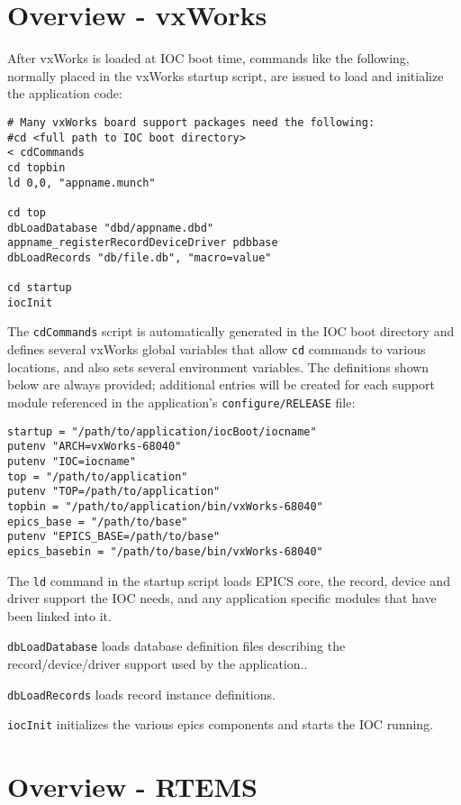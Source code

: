 \section{Overview - vxWorks}

After vxWorks is loaded at IOC boot time, commands like the following, normally placed in the vxWorks startup script, are issued to load and initialize the application code:

\begin{verbatim}
# Many vxWorks board support packages need the following:
#cd <full path to IOC boot directory>
< cdCommands
cd topbin
ld 0,0, "appname.munch"

cd top
dbLoadDatabase "dbd/appname.dbd"
appname_registerRecordDeviceDriver pdbbase
dbLoadRecords "db/file.db", "macro=value"

cd startup
iocInit
\end{verbatim}

The \verb|cdCommands| script is automatically generated in the IOC boot directory and defines several vxWorks global variables that allow \verb|cd| commands to various locations, and also sets several environment variables.
The definitions shown below are always provided; additional entries will be created for each support module referenced in the application's \verb|configure/RELEASE| file:

\begin{verbatim}
startup = "/path/to/application/iocBoot/iocname"
putenv "ARCH=vxWorks-68040"
putenv "IOC=iocname"
top = "/path/to/application"
putenv "TOP=/path/to/application"
topbin = "/path/to/application/bin/vxWorks-68040"
epics_base = "/path/to/base"
putenv "EPICS_BASE=/path/to/base"
epics_basebin = "/path/to/base/bin/vxWorks-68040"
\end{verbatim}

The \verb|ld| command in the startup script loads EPICS core, the record, device and driver support the IOC needs, and any application specific modules that have been linked into it.

\verb|dbLoadDatabase| loads database definition files describing the record/device/driver support used by the application..

\verb|dbLoadRecords| loads record instance definitions.

\verb|iocInit| initializes the various epics components and starts the IOC running.

\section{Overview - RTEMS}

